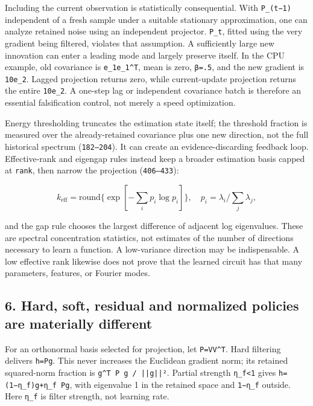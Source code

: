 \documentclass[
  british,
  10pt,
  a4paper,
]{article}
\begin{document}
Including the current observation is statistically
consequentia\allowbreak{}l.\allowbreak{} With \texttt{P\_(t−1)}
independent of a fresh sample under a suitable stationary
approximatio\allowbreak{}n,\allowbreak{} one can analyze retained noise
using an independent projector. \texttt{P\_t}, fitted using the very
gradient being filtered, violates that assumption.\allowbreak{} A
sufficiently large new innovation can enter a leading mode and largely
preserve itself. In the CPU example, old covariance is
\texttt{e\_1e\_1\^{}T}, mean is zero, \texttt{β=.5}, and the new
gradient is \texttt{10e\_2}. Lagged projection returns zero, while
current-\allowbreak{}update projection returns the entire
\texttt{10e\_2}. A one-step lag or independent covariance batch is
therefore an essential falsification control, not merely a speed
optimization\allowbreak{}.\allowbreak{}

Energy thresholding truncates the estimation state itself; the threshold
fraction is measured over the already-\allowbreak{}retained covariance
plus one new direction, not the full historical spectrum
(\texttt{182–204}). It can create an evidence-\allowbreak{}discarding
feedback loop. Effective-\allowbreak{}rank and eigengap rules instead
keep a broader estimation basis capped at \texttt{rank}, then narrow the
projection (\texttt{406–433}):

\[
k_{\mathrm{eff}}=\mathrm{round}\{\exp[-\sum_i p_i\log p_i]\},\quad
p_i=\lambda_i/\sum_j\lambda_j,
\]

and the gap rule chooses the largest difference of adjacent log
eigenvalues.\allowbreak{} These are spectral concentration
statistics,\allowbreak{} not estimates of the number of directions
necessary to learn a function. A low-\allowbreak{}variance direction may
be indispensabl\allowbreak{}e.\allowbreak{} A low effective rank
likewise does not prove that the learned circuit has that many
parameters,\allowbreak{} features, or Fourier modes.

\subsection{6. Hard, soft, residual and normalized policies are
materially
different}\label{mathematical-audit--hard-soft-residual-and-normalized-policies-are-materially-different}

For an orthonormal basis selected for projection,\allowbreak{} let
\texttt{P=VV\^{}T}. Hard filtering delivers \texttt{h=Pg}. This never
increases the Euclidean gradient norm; its retained
squared-\allowbreak{}norm fraction is
\texttt{g\textasciicircum{}T \allowbreak{}P \allowbreak{}g \allowbreak{}/\allowbreak{} \allowbreak{}||g||²}.
Partial strength \texttt{η\_f\textless{}1} gives
\texttt{h=\allowbreak{}(1−η\_\allowbreak{}f)g+η\_\allowbreak{}f \allowbreak{}Pg},
with eigenvalue 1 in the retained space and \texttt{1−η\_f} outside.
Here \texttt{η\_f} is filter strength, not learning rate.
\end{document}

